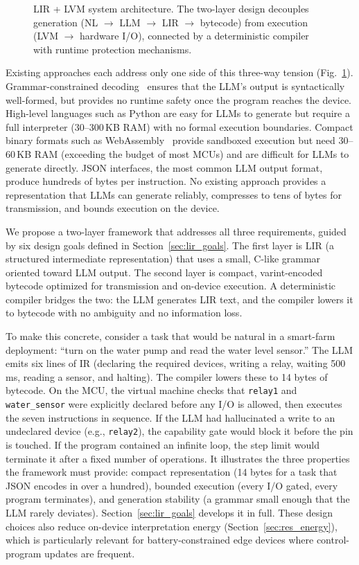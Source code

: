\documentclass[a4paper,fleqn,longmktitle]{cas-dc}
\begin{document}
\begin{figure}[!tbp]
  \centering
  
  \caption{LIR + LVM system architecture. The two-layer design decouples generation (NL $\to$ LLM $\to$ LIR $\to$ bytecode) from execution (LVM $\to$ hardware I/O), connected by a deterministic compiler with runtime protection mechanisms.}
  \label{fig:architecture}
\end{figure}

Existing approaches each address only one side of this three-way tension (Fig.~\ref{fig:architecture}). Grammar-constrained decoding~\citep{willard2023structured} ensures that the LLM's output is syntactically well-formed, but provides no runtime safety once the program reaches the device. High-level languages such as Python are easy for LLMs to generate but require a full interpreter (30--300\,KB RAM) with no formal execution boundaries. Compact binary formats such as WebAssembly~\citep{wamr} provide sandboxed execution but need 30--60\,KB RAM (exceeding the budget of most MCUs) and are difficult for LLMs to generate directly. JSON interfaces, the most common LLM output format, produce hundreds of bytes per instruction. No existing approach provides a representation that LLMs can generate reliably, compresses to tens of bytes for transmission, and bounds execution on the device.

We propose a two-layer framework that addresses all three requirements, guided by six design goals defined in Section~\ref{sec:lir_goals}. The first layer is LIR (a structured intermediate representation) that uses a small, C-like grammar oriented toward LLM output. The second layer is compact, varint-encoded bytecode optimized for transmission and on-device execution. A deterministic compiler bridges the two: the LLM generates LIR text, and the compiler lowers it to bytecode with no ambiguity and no information loss.

To make this concrete, consider a task that would be natural in a smart-farm deployment: ``turn on the water pump and read the water level sensor.'' The LLM emits six lines of IR (declaring the required devices, writing a relay, waiting 500\,ms, reading a sensor, and halting). The compiler lowers these to 14 bytes of bytecode. On the MCU, the virtual machine checks that \texttt{relay1} and \texttt{water\_sensor} were explicitly declared before any I/O is allowed, then executes the seven instructions in sequence. If the LLM had hallucinated a write to an undeclared device (e.g., \texttt{relay2}), the capability gate would block it before the pin is touched. If the program contained an infinite loop, the step limit would terminate it after a fixed number of operations. It illustrates the three properties the framework must provide: compact representation (14 bytes for a task that JSON encodes in over a hundred), bounded execution (every I/O gated, every program terminates), and generation stability (a grammar small enough that the LLM rarely deviates). Section~\ref{sec:lir_goals} develops it in full. These design choices also reduce on-device interpretation energy (Section~\ref{sec:res_energy}), which is particularly relevant for battery-constrained edge devices where control-program updates are frequent.
\end{document}
